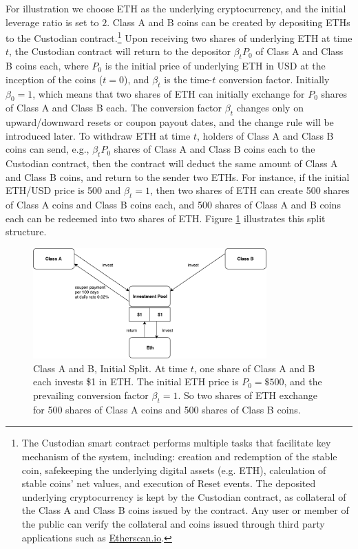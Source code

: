 \documentclass[draft, noinfoline]{ectaart}
\numberwithin{equation}{section}
\theoremstyle{plain}
\begin{document}
For illustration we choose ETH as the underlying cryptocurrency, and the initial leverage ratio is set to $2$. Class A and B coins can be created by depositing ETHs to the Custodian contract.\footnote{The Custodian smart contract performs multiple tasks that facilitate key mechanism of the system, including: creation and redemption of the stable coin, safekeeping the underlying digital assets (e.g. ETH), calculation of stable coins' net values, and execution of Reset events. The deposited underlying cryptocurrency is kept by the Custodian contract, as collateral of the Class A and Class B coins issued by the contract. Any user or member of the public can verify the collateral and coins issued through third party applications such as \href{http://etherscan.io}{Etherscan.io}.} Upon receiving two shares of underlying ETH at time $t$, the Custodian contract will return to the depositor $\beta_t P_0 $ of Class A and Class B coins each, where $P_{0}$ is the initial price of underlying ETH in USD at the inception of the coins ($t=0$), and $\beta_t$ is the time-$t$ conversion factor. Initially $\beta_0=1$, which means that two shares of ETH can initially exchange for $P_0$ shares of Class A and Class B each. The conversion factor $\beta_t$ changes only on upward/downward resets or coupon payout dates, and the change rule will be introduced later. To withdraw ETH at time $t$, holders of Class A and Class B coins can send, e.g., $\beta_t P_0$ shares of Class A and Class B coins each to the Custodian contract, then the contract will deduct the same amount of Class A and Class B coins, and return to the sender two ETHs.
For instance, if the initial ETH/USD price is 500 and $\beta_t=1$, then two shares of ETH can create 500 shares of Class A coins and Class B coins each, and 500 shares of Class A and B coins each can be redeemed into two shares of ETH. Figure \ref{fig:initial} illustrates this split structure.

\begin{figure}[!htb]
	\centering
	\includegraphics[width=0.8\textwidth]{initial}
	\caption{Class A and B, Initial Split. At time $t$, one share of Class A and B each invests \$1 in ETH. The initial ETH price is $P_0=\$500$, and the prevailing conversion factor $\beta_t=1$. So two shares of ETH exchange for 500 shares of Class A coins and 500 shares of Class B coins.}\label{fig:initial}
\end{figure}
\end{document}
